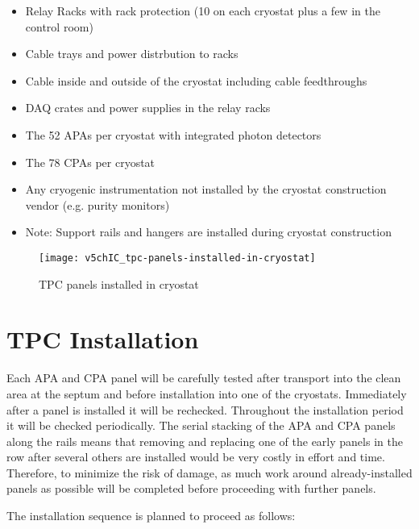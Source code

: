 \begin{itemize}
\item Relay Racks with rack protection (10 on each cryostat plus a few in the control room)
\item Cable trays and power distrbution to racks
\item Cable inside and outside of the cryostat including cable feedthroughs
\item DAQ crates and power supplies in the relay racks
\item The 52 APAs per cryostat with integrated photon detectors
\item The 78 CPAs per cryostat
\item Any cryogenic instrumentation not installed by the cryostat construction vendor (e.g. purity monitors)
\item Note: Support rails and hangers are installed during cryostat construction
\end{itemize}

\begin{figure}[htpb]
\centering
\texttt{[image: v5chIC\_tpc-panels-installed-in-cryostat]}
\caption{TPC panels installed in cryostat 
}
\label{fig:tpc-panels-installed}
\end{figure}

\section{TPC Installation}

Each APA and CPA panel will be carefully tested after transport into the clean area at the septum and before installation into one of the cryostats.  Immediately after a panel is installed it will be rechecked. Throughout the installation period it will be checked periodically. The serial stacking of the APA and CPA panels along the rails means that removing and replacing one of the early panels in the row after several others are installed would be very costly in effort and time. Therefore, to minimize the risk of damage,  as much work around already-installed panels as possible will be completed before proceeding with further panels.

The installation sequence is planned to proceed as follows:


